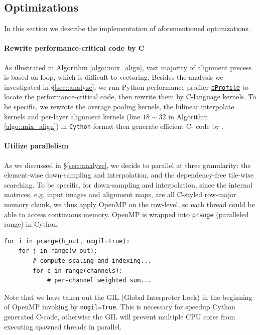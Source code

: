 \documentclass[conference, 10pt]{IEEEtran}
\makeatletter
\newcommand*{\eg}{e.g.\@\xspace}
\makeatother
\begin{document}
\subsection{Optimizations}
In this section we describe the implementation of aforementioned optimizations.

\paragraph{Rewrite performance-critical code by C} As illustrated in Algorithm \ref{algo::mix_align},
vast majority of alignment precess is based on loop, which is difficult to vectoring.
Besides the analysis we investigated in \S \ref{sec::analyze},
we run Python performance profiler \href{https://docs.python.org/3.7/library/profile.html}{\texttt{cProfile}}
to locate the performance-critical code, then rewrite them by C-language kernels.
To be specific, we rewrote the average pooling kernels, the bilinear interpolate kernels
and per-layer alignment kernels (line $18 \sim 32$ in Algorithm \ref{algo::mix_align})
in \texttt{Cython} format then generate efficient C- code by \cite{behnel2011cython}.

\paragraph{Utilize parallelism} As we discussed in \S \ref{sec::analyze}, we decide
to parallel at three granularity: the element-wise down-sampling and interpolation,
and the dependency-free tile-wise searching. To be specific, for down-sampling and interpolation,
since the internal matrices, \eg input images and alignment maps, are all C-styled
row-major memory chunk, we thus apply OpenMP \cite{dagum1998openmp} on the row-level,
so each thread could be able to access continuous memory. OpenMP is wrapped into
{\tt prange} (paralleled range) in Cython:
\begin{verbatim}
for i in prange(h_out, nogil=True):
    for j in range(w_out):
        # compute scaling and indexing...
        for c in range(channels):
            # per-channel weighted sum...
\end{verbatim}
Note that we have taken out the GIL (Global Interpreter Lock) \cite{Sajip2009GIL} in the
beginning of OpenMP invoking by {\tt nogil=True}. This is necessary for speedup
Cython generated C-code, otherwise the GIL will prevent multiple CPU cores from executing
spawned threads in parallel.
\end{document}
